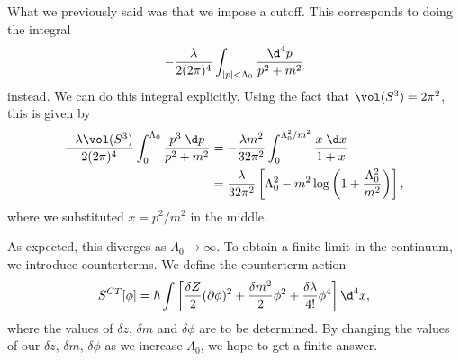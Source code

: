 \documentclass[a4paper]{article}
\begin{document}
What we previously said was that we impose a cutoff. This corresponds to doing the integral
\[
  -\frac{\lambda}{2(2\pi)^4} \int_{|p| < \Lambda_0} \frac{\d^4 p}{p^2 + m^2}
\]
instead. We can do this integral explicitly.
%
%
%
%
%
Using the fact that $\vol(S^3) = 2\pi^2$, this is given by
\begin{align*}
  \frac{-\lambda \vol(S^3)}{2(2\pi)^4} \int_0^{\Lambda_0} \frac{p^3 \;\d p}{p^2 + m^2} &= -\frac{\lambda m^2}{32 \pi^2} \int_0^{\Lambda_0^2/m^2} \frac{x \;\d x}{1 + x} \\
  &= \frac{\lambda}{32 \pi^2} \left[\Lambda_0^2 - m^2 \log \left(1 + \frac{\Lambda_0^2}{m^2}\right)\right],
\end{align*}
where we substituted $x = p^2/m^2$ in the middle.

As expected, this diverges as $\Lambda_0 \to \infty$. To obtain a finite limit in the continuum, we introduce counterterms. We define the counterterm action
\[
  S^{CT}[\phi] = \hbar \int \left[\frac{\delta Z}{2} (\partial \phi)^2 + \frac{\delta m^2}{2} \phi^2 + \frac{\delta \lambda}{4!} \phi^4\right] \d^4 x,
\]
where the values of $\delta z$, $\delta m$ and $\delta \phi$ are to be determined. By changing the values of our $\delta z$, $\delta m$, $\delta\phi$ as we increase $\Lambda_0$, we hope to get a finite answer.
\end{document}
